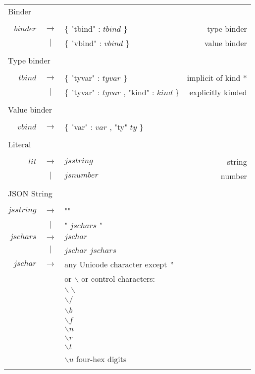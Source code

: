 \begin{scriptsize}
\begin{longtable}{ r c l r }
\multicolumn{4}{l}{Binder}			 \\
\\[0.01in]
$binder$	& $ \rightarrow $	& $\{$ "tbind" : $tbind$ $\}$											& type binder		\\
		& $ | $			& $\{$ "vbind" : $vbind$ $\}$											& value binder		\\
\\[0.01in]

\multicolumn{4}{l}{Type binder}			 \\
\\[0.01in]
$tbind$		& $ \rightarrow $	& $\{$ "tyvar" : $tyvar$ $\}$											& implicit of kind * 	\\
		& $ | $			& $\{$ "tyvar" : $tyvar$ , "kind" : $kind$ $\}$									& explicitly kinded	\\
\\[0.01in]

\multicolumn{4}{l}{Value binder}			 \\
\\[0.01in]
$vbind$		& $ \rightarrow $	& $\{$ "var" : $var$ , "ty" $ty$ $\}$ 										& \\
\\[0.01in]

\multicolumn{4}{l}{Literal}			 \\
\\[0.01in]
$lit$		& $ \rightarrow $	& $jsstring$													& string 		\\ 
		& $ | $			& $jsnumber$													& number		\\
\\[0.01in]

\multicolumn{4}{l}{JSON String}			 \\
\\[0.01in]
$jsstring$	& $ \rightarrow $	& ""														& \\
		& $ | $			& " $jschars$ "													& \\
$jschars$	& $ \rightarrow $	& $jschar$													& \\
		& $ | $			& $jschar$ $jschars$												& \\
$jschar$	& $ \rightarrow $	& any Unicode character except $"$ 										& \\ 
		&			& or $\backslash$ or control characters: 									& \\
		&			& $\backslash\backslash$											& \\
		&			& $\backslash /$ 												& \\
		&			& $\backslash b$ 												& \\
		& 			& $\backslash f$ 												& \\
		&			& $\backslash n$												& \\
		& 			& $\backslash r$ 												& \\
		&			& $\backslash t$ 												& \\
		& 			& $\backslash u$ four-hex digits\\
\\[0.01in]


\end{longtable}
\end{scriptsize}
